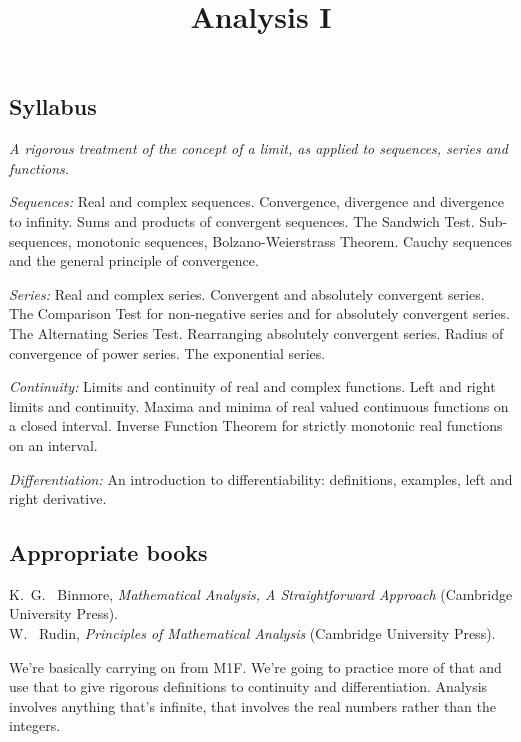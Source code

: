 \documentclass[10pt,twoside]{scrartcl}
\title{Analysis I}
\begin{document}
{

\subsection*{Syllabus}  

\textit{A rigorous treatment of the concept of a limit, as applied to sequences, series and functions.}

\emph{Sequences:}
Real and complex sequences. Convergence, divergence and divergence to infinity. Sums and products of convergent sequences. The Sandwich Test. Sub-sequences, monotonic sequences, Bolzano-Weierstrass Theorem. Cauchy sequences and the general principle of convergence.

\emph{Series:}
Real and complex series. Convergent and absolutely convergent series. The Comparison Test for non-negative series and for absolutely convergent series. The Alternating Series Test.  Rearranging absolutely convergent series. Radius of convergence of power series. The exponential series.

\emph{Continuity:}
Limits and continuity of real and complex functions. Left and right limits and continuity. Maxima
and minima of real valued continuous functions on a closed interval. Inverse Function Theorem for
strictly monotonic real functions on an interval. 

\emph{Differentiation:}
 An introduction to differentiability: definitions, examples, left and right derivative.

\subsection*{Appropriate books}

{\shortskip

K.~G.~ Binmore, \textit{Mathematical Analysis, A Straightforward Approach} (Cambridge University Press).\\

W.~ Rudin, \textit{Principles of Mathematical Analysis} (Cambridge University Press).
}

}

\TableofContents

\pagebreak
\setcounter{section}{-1}

\setcounter{lecture}{-1}

\setcounter{page}{3}


We're  basically carrying on from M1F. We're going to practice more of that and use that to give rigorous definitions to continuity and differentiation. Analysis involves anything that's infinite, that involves the real numbers rather than the integers. 
\end{document}
